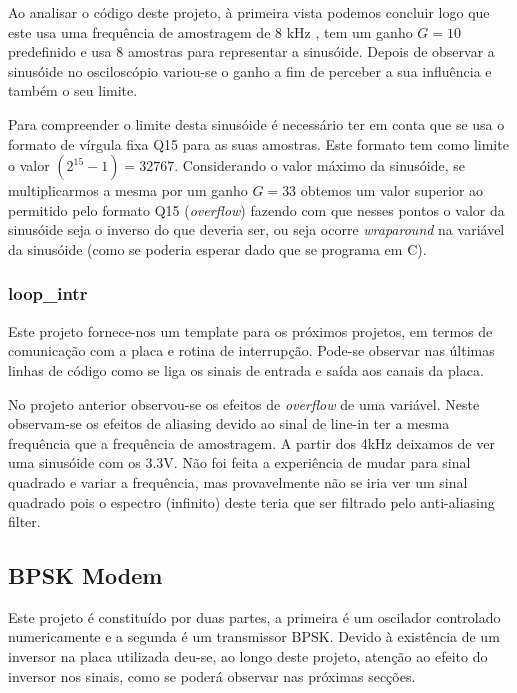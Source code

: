 \documentclass[11pt]{article}
\numberwithin{equation}{section}
\begin{document}
Ao analisar o código deste projeto, à primeira vista podemos concluir logo que este usa uma frequência de amostragem de 8 kHz , tem um ganho $G=10$ predefinido e usa 8 amostras para representar a sinusóide. Depois de observar a sinusóide no osciloscópio variou-se o ganho a fim de perceber a sua influência e também o seu limite.
 
Para compreender o limite desta sinusóide é necessário ter em conta que se usa o formato de vírgula fixa Q15 para as suas amostras. Este formato tem como limite o valor $(2^{15}-1) = 32767$. Considerando o valor máximo da sinusóide, se multiplicarmos a mesma por um ganho $G=33$ obtemos um valor superior ao permitido pelo formato Q15 (\textit{overflow}) fazendo com que nesses pontos o valor da sinusóide seja o inverso do que deveria ser, ou seja ocorre \textit{wraparound} na variável da sinusóide (como se poderia esperar dado que se programa em C). 

\subsubsection{loop\_intr}
\label{sec:loop}
Este projeto fornece-nos um template para os próximos projetos, em termos de comunicação com a placa e rotina de interrupção. Pode-se observar nas últimas linhas de código como se liga os sinais de entrada e saída aos canais da placa.

No projeto anterior observou-se os efeitos de \textit{overflow} de uma variável. Neste observam-se os efeitos de aliasing  devido ao sinal de line-in ter a mesma frequência que a frequência de amostragem. A partir dos 4kHz deixamos de ver uma sinusóide com os 3.3V. Não foi feita a experiência de mudar para sinal quadrado e variar a frequência, mas provavelmente não se iria ver um sinal quadrado pois o espectro (infinito) deste teria que ser filtrado pelo anti-aliasing filter. 

\subsection{BPSK Modem}
Este projeto é constituído por duas partes, a primeira é um oscilador controlado numericamente e a segunda é um transmissor BPSK. Devido à existência de um inversor na placa utilizada deu-se, ao longo deste projeto, atenção ao efeito do inversor nos sinais, como se poderá observar nas próximas secções.
\end{document}

